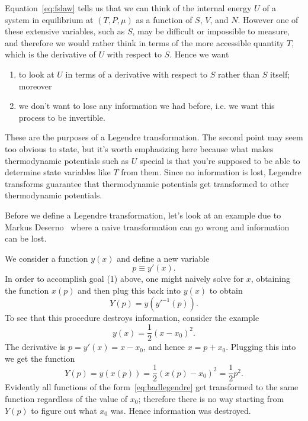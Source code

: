 Equation~\eqref{eq:fslaw} tells us that we can think of the internal energy
$U$ of a system in equilibrium at $(T,P,\mu)$ as a function of $S$, $V$, and
$N$. However one of these extensive variables, such as $S$, may be
difficult or impossible to measure, and therefore we would rather
think in terms of the more accessible quantity $T$, which 
is the derivative of $U$ with respect to $S$. 
Hence we want 
\begin{enumerate}
\item to look at $U$ in terms of a derivative with respect to $S$ rather 
      than $S$ itself; moreover 
\item we don't want to lose any information we had before, i.e. we want this
      process to be invertible. 
\end{enumerate}
These are the purposes of a Legendre transformation. The second point 
may seem too obvious to state, but it's worth emphasizing here because 
what makes thermodynamic potentials such as $U$ special is that you're 
supposed to be able to determine state variables like $T$ from them. 
Since no information is lost, Legendre transforms guarantee that 
thermodynamic potentials get transformed to other thermodynamic potentials.

Before we define a Legendre transformation, let's look at an example
due to Markus Deserno~\cite{deserno} where a naive transformation can go
wrong and information can be lost. 
\begin{example*}{}
We consider a function $y(x)$ and define a new variable
\begin{equation}\label{eq:xlegendre}
  p\equiv y'(x).
\end{equation}
In order to accomplish goal (1) above, one might naively solve
 for $x$, obtaining the function $x(p)$
and then plug this back into $y(x)$ to obtain
\begin{equation}
  Y(p)=y\left(y'^{-1}(p)\right).
\end{equation}
To see that this procedure destroys information, consider the example
\begin{equation}\label{eq:badlegendre}
  y(x)=\frac{1}{2}(x-x_0)^2.
\end{equation}
The derivative is $p=y'(x)=x-x_0$, and hence $x=p+x_0$. Plugging this
into  we get the function
\begin{equation}
  Y(p)=y(x(p))=\frac{1}{2}\left(x(p)-x_0\right)^2=\frac{1}{2}p^2.
\end{equation}
Evidently all functions of the form~\eqref{eq:badlegendre} get transformed
to the same function regardless of the value of $x_0$; therefore there is
no way starting from $Y(p)$ to figure out what $x_0$ was. Hence
information was destroyed.
\end{example*}

